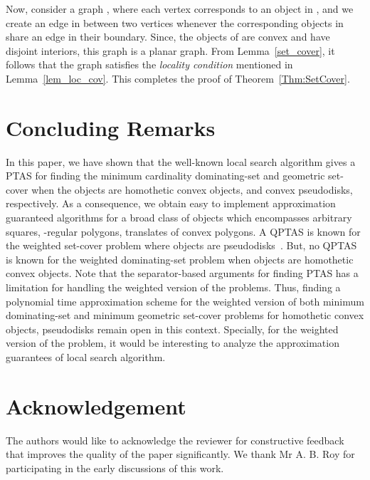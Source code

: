 \documentclass[a4paper,11pt]{article}
\begin{document}
Now,  consider  a graph , where  each vertex 
 corresponds to an object in ,  and we create an edge in between two vertices whenever the corresponding objects in  share an edge in their boundary. 
Since, the objects of  are convex and have disjoint interiors, this graph is a  planar graph.  
From Lemma~\ref{set_cover}, it follows that  the graph  satisfies the {\it locality condition} mentioned in  Lemma~\ref{lem_loc_cov}.
This completes the proof of Theorem~\ref{Thm:SetCover}.



\section{Concluding Remarks}
In this paper, we have shown that the well-known local search algorithm gives a PTAS for  finding the minimum cardinality dominating-set and geometric set-cover when the objects are homothetic convex objects, and  convex pseudodisks, respectively. 
As a consequence, we obtain easy to implement approximation guaranteed algorithms for a broad class of objects which encompasses arbitrary squares, -regular polygons,  translates of  convex polygons. 
A QPTAS is known for the weighted set-cover problem where objects are pseudodisks~\cite{Ray}. 
But,  no QPTAS is known for the weighted dominating-set problem when objects are homothetic convex objects.  
Note that the separator-based arguments for finding PTAS has a limitation for handling the weighted version of the problems. 
Thus, finding a polynomial time approximation scheme for the weighted version of both minimum dominating-set and minimum geometric set-cover problems for  homothetic convex objects, pseudodisks remain open in this context. 
Specially, for the weighted version of the problem, it would be interesting to analyze the approximation guarantees of local search algorithm.

\section*{Acknowledgement}
The authors would like to acknowledge the reviewer for constructive feedback that improves the quality of the paper significantly.
We thank Mr A. B. Roy  for participating in the early discussions of this work.
\end{document}
